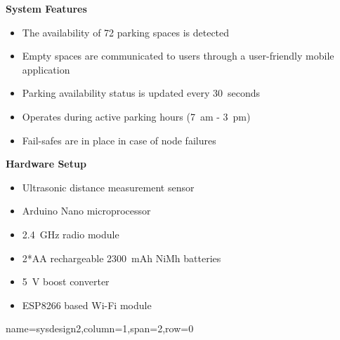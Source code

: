 \documentclass[landscape,a1paper,fontscale=0.47]{baposter} %
\newcommand{\compresslist}{ %
\setlength{\itemsep}{1pt}
\setlength{\parskip}{0pt}
\setlength{\parsep}{0pt}
}
\begin{document}
\begin{poster}
{	\textbf{System Features}
		\begin{itemize}[leftmargin=13pt]\compresslist
			\item The availability of 72 parking spaces is detected
			\item Empty spaces are communicated to users through a user-friendly mobile application
			\item Parking availability status is updated every 30~seconds
			\item Operates during active parking hours (7~am - 3~pm)
			\item Fail-safes are in place in case of node failures
		\end{itemize}
	
	\textbf{Hardware Setup}
		\begin{itemize}[leftmargin=13pt]\compresslist
			\item Ultrasonic distance measurement sensor
			\item Arduino Nano microprocessor
			\item 2.4~GHz radio module
			\item 2*AA rechargeable 2300~mAh NiMh batteries
			\item 5~V boost converter
			\item ESP8266 based Wi-Fi module
		\end{itemize}

}

{name=sysdesign2,column=1,span=2,row=0}{ 
	\begin{multicols}{2}
		

\end{multicols}}
\end{poster}
\end{document}
